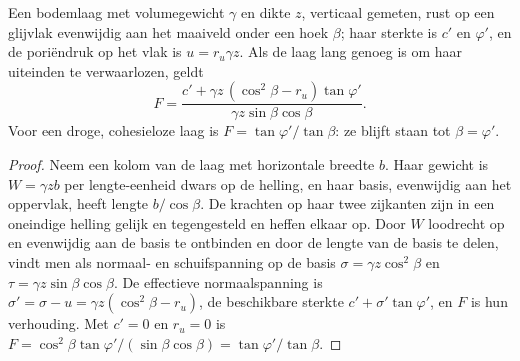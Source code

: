 \begin{proposition}\label{prop:b2:geological-hazards:infinite-slope}
Een bodemlaag met volumegewicht $\gamma$ en dikte $z$, verticaal gemeten, rust op een glijvlak
evenwijdig aan het maaiveld onder een hoek $\beta$; haar sterkte is $c'$ en $\varphi'$, en de
poriëndruk op het vlak is $u = r_u \gamma z$. Als de laag lang genoeg is om haar uiteinden te
verwaarlozen, geldt
\begin{equation}
F = \frac{c' + \gamma z\,(\cos^2\beta - r_u)\tan\varphi'}{\gamma z \sin\beta\cos\beta}.
\label{eq:b2:geological-hazards:infinite-slope}
\end{equation}
Voor een droge, cohesieloze laag is $F = \tan\varphi'/\tan\beta$: ze blijft staan tot $\beta = \varphi'$.
\end{proposition}

\begin{proof}
Neem een kolom van de laag met horizontale breedte $b$. Haar gewicht is $W = \gamma z b$ per lengte-eenheid
dwars op de helling, en haar basis, evenwijdig aan het oppervlak, heeft lengte $b/\cos\beta$. De krachten op
haar twee zijkanten zijn in een oneindige helling gelijk en tegengesteld en heffen elkaar op. Door $W$ loodrecht
op en evenwijdig aan de basis te ontbinden en door de lengte van de basis te delen, vindt men als normaal- en schuifspanning op de basis
$\sigma = \gamma z\cos^2\beta$ en $\tau = \gamma z \sin\beta\cos\beta$. De effectieve
normaalspanning is $\sigma' = \sigma - u = \gamma z(\cos^2\beta - r_u)$, de beschikbare sterkte $c' +
\sigma'\tan\varphi'$, en $F$ is hun verhouding. Met $c' = 0$ en $r_u = 0$ is $F = \cos^2\beta
\tan\varphi'/(\sin\beta\cos\beta) = \tan\varphi'/\tan\beta$.
\end{proof}

